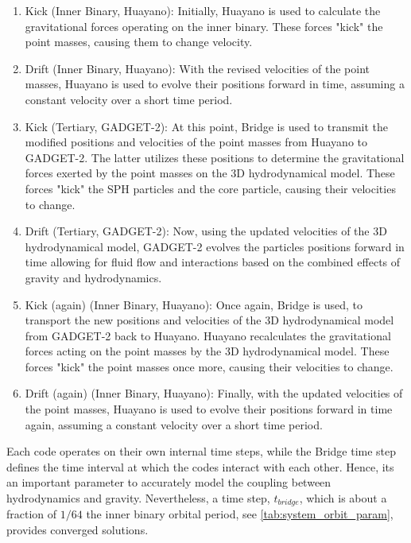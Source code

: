 \begin{enumerate}
    \item Kick (Inner Binary, Huayano): Initially, Huayano is used to calculate the gravitational forces operating on the inner binary. These forces "kick" the point masses, causing them to change velocity.
    \item Drift (Inner Binary, Huayano): With the revised velocities of the point masses, Huayano is used to evolve their positions forward in time, assuming a constant velocity over a short time period.
    \item Kick (Tertiary, GADGET-2): At this point, Bridge is used to transmit the modified positions and velocities of the point masses from Huayano to GADGET-2. The latter utilizes these positions to determine the gravitational forces exerted by the point masses on the 3D hydrodynamical model. These forces "kick" the SPH particles and the core particle, causing their velocities to change.
    \item Drift (Tertiary, GADGET-2): Now, using the updated velocities of the 3D hydrodynamical model, GADGET-2 evolves the particles positions forward in time allowing for fluid flow and interactions based on the combined effects of gravity and hydrodynamics.
    \item Kick (again) (Inner Binary, Huayano): Once again, Bridge is used, to transport the new positions and velocities of the 3D hydrodynamical model from GADGET-2 back to Huayano. Huayano recalculates the gravitational forces acting on the point masses by the 3D hydrodynamical model. These forces "kick" the point masses once more, causing their velocities to change.
    \item Drift (again) (Inner Binary, Huayano): Finally, with the updated velocities of the point masses, Huayano is used to evolve their positions forward in time again, assuming a constant velocity over a short time period.
\end{enumerate}

Each code operates on their own internal time steps, while the Bridge time step defines the time interval at which the codes interact with each other. Hence, its an important parameter to accurately model the coupling between hydrodynamics and gravity. Nevertheless, a time step, $t_{bridge}$, which is about a fraction of $1/64$ the inner binary orbital period, see \cref{tab:system_orbit_param}, provides converged solutions. 



